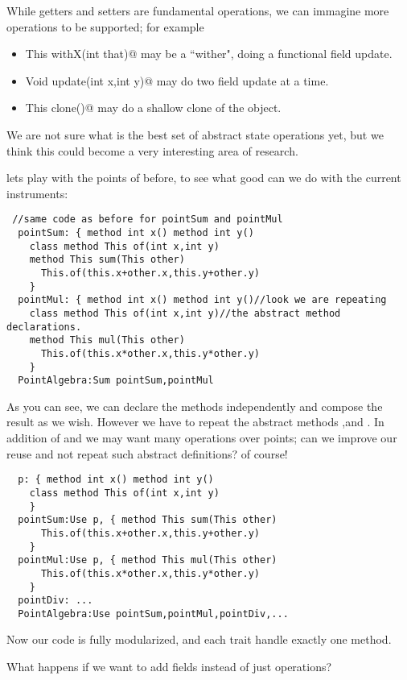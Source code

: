 While getters and setters are fundamental operations, we can immagine
more operations to be supported; for example
\begin{itemize}
\item \Q@method This withX(int that)@
may be a ``wither", doing a functional field update.
\item \Q@method Void update(int x,int y)@
may do two field update at a time.
\item\Q@method This clone()@ may do a shallow clone of the object.
\end{itemize}

We are not sure what is the best set of abstract state operations yet, but we think this could become a very interesting area of research.
  
  
  lets play with the points of before, to see what good can we do with the current
  instruments:

\begin{lstlisting}
 //same code as before for pointSum and pointMul
  pointSum: { method int x() method int y()
    class method This of(int x,int y)
    method This sum(This other)
      This.of(this.x+other.x,this.y+other.y)
    }
  pointMul: { method int x() method int y()//look we are repeating
    class method This of(int x,int y)//the abstract method declarations.
    method This mul(This other)
      This.of(this.x*other.x,this.y*other.y)
    }
  PointAlgebra:Sum pointSum,pointMul
\end{lstlisting}  

  As you can see, we can declare the methods independently and compose the result
  as we wish. However we have to repeat the abstract methods \Q@x@,\Q@y@ and \Q@of@.
  In addition of \Q@Sum@ and \Q@Mul@ we may want many operations over points; can we improve our reuse
  and not repeat such abstract definitions? of course!

\begin{lstlisting}
  p: { method int x() method int y()
    class method This of(int x,int y)
    }
  pointSum:Use p, { method This sum(This other)
      This.of(this.x+other.x,this.y+other.y)
    }
  pointMul:Use p, { method This mul(This other)
      This.of(this.x*other.x,this.y*other.y)
    }
  pointDiv: ...
  PointAlgebra:Use pointSum,pointMul,pointDiv,...
\end{lstlisting}
      
Now our code is fully modularized, and each trait handle exactly one method.

What happens if we want to add fields instead of just operations?

